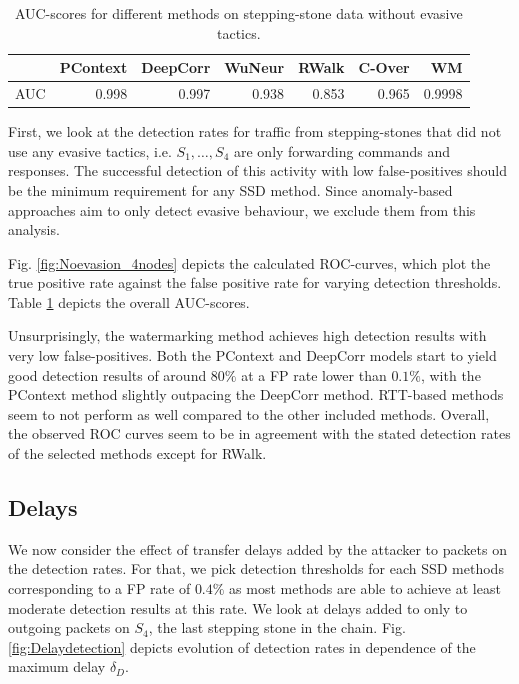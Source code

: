 \documentclass[runningheads,11pt]{llncs}\usepackage[]{graphicx}\usepackage[]{color}
\begin{document}
\begin{table}
\centering
\begin{tabular}{l|r|r|r|r|r|r}
  \hline
 & PContext & DeepCorr & WuNeur & RWalk & C-Over & WM \\ 
  \hline
AUC & 0.998 & 0.997 & 0.938 & 0.853 & 0.965 & 0.9998 \\ 
   \hline
\end{tabular}

\caption{AUC-scores for different methods on stepping-stone data without evasive tactics.}\label{Tab:dfAUC}
\end{table}

First, we look at the detection rates for traffic from stepping-stones that did not use any evasive tactics, i.e. $S_1,\dots,S_4$ are only forwarding commands and responses. The successful detection of this activity with low false-positives should be the minimum requirement for any SSD method. Since anomaly-based approaches aim to only detect evasive behaviour, we exclude them from this analysis. 

Fig. \ref{fig:Noevasion_4nodes} depicts the calculated ROC-curves, which plot the true positive rate against the false positive rate for varying detection thresholds. Table \ref{Tab:dfAUC} depicts the overall AUC-scores.



Unsurprisingly, the watermarking method achieves high detection results with very low false-positives. Both the PContext and DeepCorr models start to yield good detection results of around $80\%$ at a FP rate lower than $0.1\%$, with the PContext method slightly outpacing the DeepCorr method. 
RTT-based methods seem to not perform as well compared to the other included methods. Overall, the observed ROC curves seem to be in agreement with the stated detection rates of the selected methods except for RWalk. %




\subsection{Delays}

We now consider the effect of transfer delays added by the attacker to packets on the detection rates. For that, we pick detection thresholds for each SSD methods corresponding to a FP rate of $0.4\%$ as most methods are able to achieve at least moderate detection results at this rate. 
We look at delays added to only to outgoing packets on $S_4$, the last stepping stone in the chain. Fig. \ref{fig:Delaydetection} depicts evolution of detection rates in dependence of the maximum delay $\delta_D$.
\end{document}
